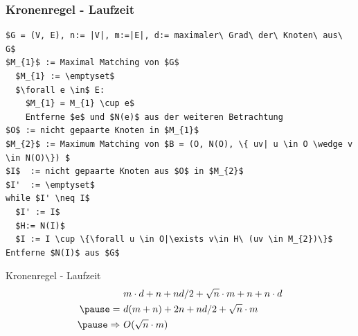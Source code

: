 \documentclass{beamer}
\begin{document}
\begin{frame}[fragile]
\frametitle{Kronenregel - Laufzeit}
\begin{lstlisting}[mathescape=true, escapechar = !,basicstyle=\ttfamily\scriptsize]
$G = (V, E), n:= |V|, m:=|E|, d:= maximaler\ Grad\ der\ Knoten\ aus\ G$
$M_{1}$ := Maximal Matching von $G$
  $M_{1} := \emptyset$
  $\forall e \in$ E:
    $M_{1} = M_{1} \cup e$
    Entferne $e$ und $N(e)$ aus der weiteren Betrachtung
$O$ := nicht gepaarte Knoten in $M_{1}$
$M_{2}$ := Maximum Matching von $B = (O, N(O), \{ uv| u \in O \wedge v \in N(O)\}) $
$I$  := nicht gepaarte Knoten aus $O$ in $M_{2}$
$I'  := \emptyset$
while $I' \neq I$
  $I' := I$
  $H:= N(I)$
  $I := I \cup \{\forall u \in O|\exists v\in H\ (uv \in M_{2})\}$
Entferne $N(I)$ aus $G$
\end{lstlisting}
\end{frame}
\begin{frame}{Kronenregel - Laufzeit}
\begin{align*}
&\ m \cdot d + n + n d/2 + \sqrt{n} \cdot m + n  + n \cdot d \\ \pause
=&\ d (m+n) +2 n + nd/2 + \sqrt{n} \cdot m \\ \pause
\Rightarrow &\ O(\sqrt{n} \cdot m)
\end{align*}
\end{frame}
\end{document}
